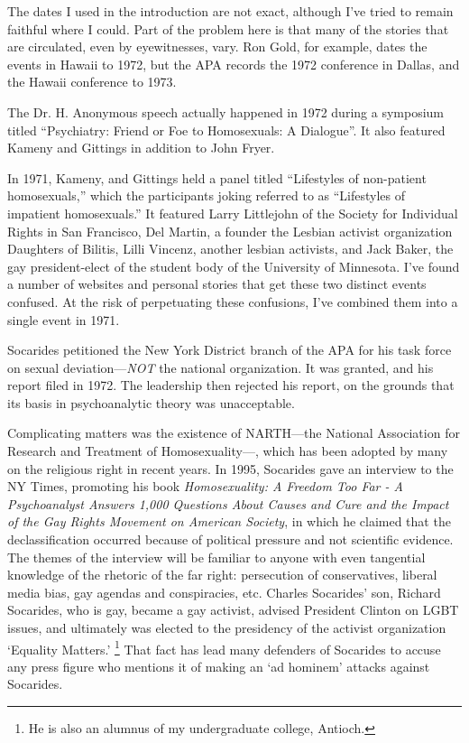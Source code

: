 \begin{refsection}
The dates I used in the introduction are not exact, although I've tried to remain faithful where I could. Part of the problem here is that many of the stories that are circulated, even by eyewitnesses, vary. Ron Gold, for example, dates the events in Hawaii to 1972, but the APA records the 1972 conference in Dallas, and the Hawaii conference to 1973. 

The Dr. H. Anonymous speech actually happened in 1972 during a symposium titled “Psychiatry: Friend or Foe to Homosexuals: A Dialogue”. It also featured Kameny and Gittings in addition to John Fryer.

In 1971, Kameny, and Gittings held a panel titled “Lifestyles of non-patient homosexuals,” which the participants joking referred to as “Lifestyles of impatient homosexuals.” It featured Larry Littlejohn of the Society for Individual Rights in San Francisco, Del Martin, a founder the Lesbian activist organization Daughters of Bilitis, Lilli Vincenz, another lesbian activists, and Jack Baker, the gay president-elect of the student body of the University of Minnesota. I've found a number of websites and personal stories that get these two distinct events confused. At the risk of perpetuating these confusions, I've combined them into a single event in 1971.

Socarides petitioned the New York District branch of the APA for his task force on sexual deviation---\emph{NOT} the national organization. It was granted, and his report filed in 1972. The leadership then rejected his report, on the grounds that its basis in psychoanalytic theory was unacceptable. 

Complicating matters was the existence of NARTH---the National Association for Research and Treatment of Homosexuality---, which has been adopted by many on the religious right in recent years. In 1995, Socarides gave an interview to the NY Times, promoting his book \emph{Homosexuality: A Freedom Too Far - A Psychoanalyst Answers 1,000 Questions About Causes and Cure and the Impact of the Gay Rights Movement on American Society}, in which he claimed that the declassification occurred because of political pressure and not scientific evidence. The themes of the interview will be familiar to anyone with even tangential knowledge of the rhetoric of the far right: persecution of conservatives, liberal media bias, gay agendas and conspiracies, etc. Charles Socarides' son, Richard Socarides, who is gay, became a gay activist, advised President Clinton on LGBT issues, and ultimately was elected to the presidency of the activist organization `Equality Matters.' \footnote{He is also an alumnus of my undergraduate college, Antioch.} That fact has lead many defenders of Socarides to accuse any press figure who mentions it of making an `ad hominem' attacks against Socarides. 


\end{refsection}
